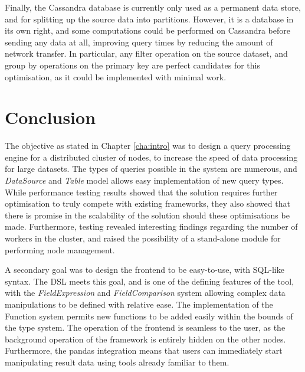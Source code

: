 Finally, the Cassandra database is currently only used as a permanent data store, and for splitting up the source data into partitions. However, it is a database in its own right, and some computations could be performed on Cassandra before sending any data at all, improving query times by reducing the amount of network transfer. In particular, any filter operation on the source dataset, and group by operations on the primary key are perfect candidates for this optimisation, as it could be implemented with minimal work.


\section{Conclusion}
The objective as stated in Chapter \ref{cha:intro} was to design a query processing engine for a distributed cluster of nodes, to increase the speed of data processing for large datasets. The types of queries possible in the system are numerous, and \textit{DataSource} and \textit{Table} model allows easy implementation of new query types. While performance testing results showed that the solution requires further optimisation to truly compete with existing frameworks, they also showed that there is promise in the scalability of the solution should these optimisations be made. Furthermore, testing revealed interesting findings regarding the number of workers in the cluster, and raised the possibility of a stand-alone module for performing node management. 

A secondary goal was to design the frontend to be easy-to-use, with SQL-like syntax. The DSL meets this goal, and is one of the defining features of the tool, with the \textit{FieldExpression} and \textit{FieldComparison} system allowing complex data manipulations to be defined with relative ease. The implementation of the Function system permits new functions to be added easily within the bounds of the type system. The operation of the frontend is seamless to the user, as the background operation of the framework is entirely hidden on the other nodes. Furthermore, the pandas integration means that users can immediately start manipulating result data using tools already familiar to them.